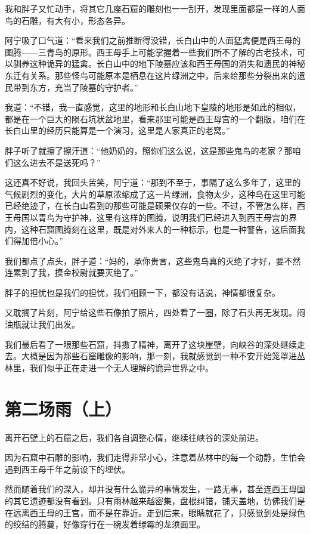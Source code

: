 我和胖子又忙动手，将其它几座石窟的雕刻也一一刮开，发现里面都是一样的人面鸟的石雕，有大有小，形态各异。

阿宁吸了口气道：“看来我们之前推断得没错，长白山中的人面猛禽便是西王母的图腾——三青鸟的原形。西王母手上可能掌握着一些我们所不了解的古老技术，可以驯养这种诡异的猛禽。长白山中的地下陵墓应该和西王母国的消失和遗民的神秘东迁有关系。那些怪鸟可能原本是栖息在这片绿洲之中，后来给那些分裂出来的遗民带到东方，充当了陵墓的守护者。”

我道：“不错，我一直感觉，这里的地形和长白山地下皇陵的地形是如此的相似，都是在一个巨大的陨石坑状盆地里，看来那里可能是西王母宫的一个翻版，咱们在长白山里的经历只能算是一个演习，这里是人家真正的老窝。”

胖子听了就擦了擦汗道：“他奶奶的，照你们这么说，这是那些鬼鸟的老家？那咱们这么进去不是送死吗？”

这还真不好说，我回头苦笑，阿宁道：“那到不至于，事隔了这么多年了，这里的气候剧烈的变化，大片的草原浓缩成了这一片绿洲，食物太少，这种鸟在这里可能已经绝迹了，在长白山看到的那些可能是硕果仅存的一些。不过，不管怎么样，西王母国以青鸟为守护神，这里有这样的图腾，说明我们已经进入到西王母宫的界内，这种石窟图腾刻在这里，既是对外来人的一种标示，也是一种警告，这后面我们得加倍小心。”

我们都点了点头，胖子道：“妈的，承你贵言，这些鬼鸟真的灭绝了才好，要不然连累到了我，摸金校尉就要灭绝了。”

胖子的担忧也是我们的担忧，我们相顾一下，都没有话说，神情都很复杂。

又耽搁了片刻，阿宁给这些石像拍了照片，四处看了一圈，除了石头再无发现。闷油瓶就让我们出发。

我们最后看了一眼那些石窟，抖擞了精神，离开了这块崖壁，向峡谷的深处继续走去。大概是因为那些石窟雕像的影响，那一刻，我就感觉到一种不安开始笼罩进丛林里，我们似乎正在走进一个无人理解的诡异世界之中。

\chapter{第二场雨（上）}

离开石壁上的石窟之后，我们各自调整心情，继续往峡谷的深处前进。

因为石窟中石雕的影响，我们走得非常小心，注意着丛林中的每一个动静，生怕会遇到西王母千年之前设下的埋伏。

然而随着我们的深入，却并没有什么诡异的事情发生，一路无事，甚至连西王母国的其它遗迹都没有看到。只有雨林越来越密集，盘根纠错，铺天盖地，仿佛我们是在远离西王母的王宫，而不是在靠近。走到后来，眼睛就花了，只感觉到处是绿色的绞结的腾蔓，好像穿行在一碗发着绿霉的龙须面里。

